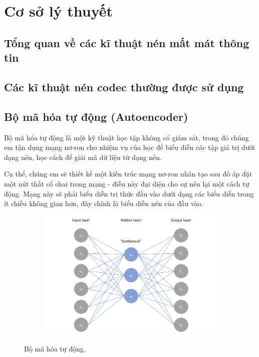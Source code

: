 \chapter{Cơ sở lý thuyết}
\label{cha: chap2}

\section{Tổng quan về các kĩ thuật nén mất mát thông tin}

\section{Các kĩ thuật nén codec thường được sử dụng}

\section{Bộ mã hóa tự động (Autoencoder)}

Bộ mã hóa tự động là một kỹ thuật học tập không có giám sát,
trong đó chúng em tận dụng mạng nơ-ron cho nhiệm vụ của học để biểu diễn các tập
giá trị dưới dạng nén, học cách để giải mã dữ liệu từ dạng nén.

Cụ thể, chúng em sẽ thiết kế một kiến trúc mạng nơ-ron nhân tạo sau đó áp đặt một
nút thắt cổ chai trong mạng - điều này đại diện cho sự nén lại một cách tự động.
Mạng này sẽ phải biểu diễn tri thức đầu vào dưới dạng các biểu diễn trong ít
chiều không gian hơn, đây chính là biểu diễn nén của đầu vào.

\begin{figure}
    \begin{subfigure}{0.8\textwidth}
        \includegraphics[width=1.0\linewidth]{Chapters/items/autoencoder1.png}
        \caption{}
        \label{fig: auto1}
    \end{subfigure}
    \caption{Bộ mã hóa tự động.}
\end{figure}

